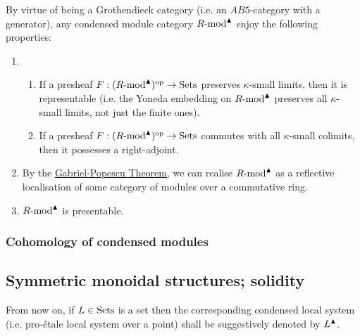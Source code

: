                 \begin{corollary} \label{coro: condensed_modules_properties}
                    By virtue of being a Grothendieck category (i.e. an $AB5$-category with a generator), any condensed module category $R\text{-}\mathrm{mod}^{\blacktriangle}$ enjoy the following properties:
                        \begin{enumerate}
                            \item 
                                \begin{enumerate}
                                    \item If a presheaf $F: (R\text{-}\mathrm{mod}^{\blacktriangle})^{\mathrm{op}} \to \mathrm{Sets}$ preserves $\kappa$-small limits, then it is representable (i.e. the Yoneda embedding on $R\text{-}\mathrm{mod}^{\blacktriangle}$ preserves all $\kappa$-small limits, not just the finite ones).
                                    \item If a presheaf $F: (R\text{-}\mathrm{mod}^{\blacktriangle})^{\mathrm{op}} \to \mathrm{Sets}$ commutes with all $\kappa$-small colimits, then it possesses a right-adjoint. 
                                \end{enumerate}
                            \item By the \href{https://ncatlab.org/nlab/show/Gabriel-Popescu+theorem}{\underline{Gabriel-Popescu Theorem}}, we can realise $R\text{-}\mathrm{mod}^{\blacktriangle}$ as a reflective localisation of some category of modules over a commutative ring. 
                            \item $R\text{-}\mathrm{mod}^{\blacktriangle}$ is presentable. 
                        \end{enumerate}
                \end{corollary}
                
            \subsubsection{Cohomology of condensed modules}
            
        \subsection{Symmetric monoidal structures; solidity}
            \begin{convention}
                From now on, if $L \in \mathrm{Sets}$ is a set then the corresponding condensed local system (i.e. pro-\'etale local system over a point) shall be suggestively denoted by $L^{\blacktriangle}$.
            \end{convention}
        
